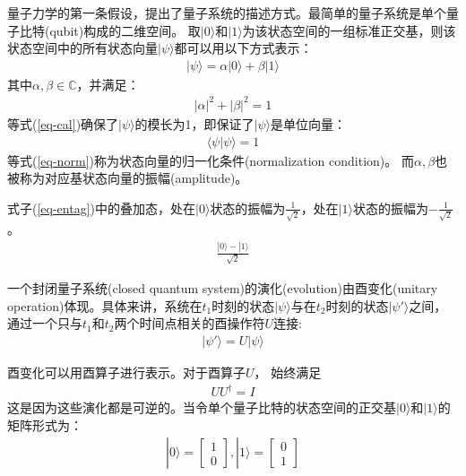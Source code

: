 量子力学的第一条假设，提出了量子系统的描述方式。最简单的量子系统是单个量子比特(qubit)构成的二维空间。
取$|0\rangle$和$|1\rangle$为该状态空间的一组标准正交基，则该状态空间中的所有状态向量$|\psi\rangle$都可以用以下方式表示：
\begin{align}
    |\psi\rangle = \alpha|0\rangle + \beta|1\rangle
\end{align}
其中$\alpha,\beta\in \mathbb{C}$，并满足：
\begin{align}
    |\alpha|^2+|\beta|^2  = 1
    \label{eq-cal}
\end{align}
等式(\ref{eq-cal})确保了$|\psi\rangle$的模长为1，即保证了$|\psi\rangle$是单位向量：
\begin{align}
    \langle\psi|\psi\rangle = 1
    \label{eq-norm}
\end{align}
等式(\ref{eq-norm})称为状态向量的归一化条件(normalization condition)。
而\(\alpha,\beta\)也被称为对应基状态向量的振幅(amplitude)。
\begin{example}
    式子(\ref{eq-entag})中的叠加态，处在$|0\rangle$状态的振幅为$\frac{1}{\sqrt{2}}$，处在$|1\rangle$状态的振幅为$-\frac{1}{\sqrt{2}}$。
\begin{align}
    \label{eq-entag}
    \frac{|0\rangle-|1\rangle}{\sqrt{2}}
\end{align}
\end{example}
\begin{theorem}\citep{nielsen2010quantum}
    一个封闭量子系统(closed quantum system)的演化(evolution)由酉变化(unitary operation)体现。具体来讲，系统在$t_1$时刻的状态$|\psi\rangle$与在$t_2$时刻的状态$|\psi'\rangle$之间，通过一个只与$t_1$和$t_2$两个时间点相关的酉操作符$U$连接:
    \begin{align}
        |\psi'\rangle = U|\psi\rangle
    \end{align}
\end{theorem}
酉变化可以用酉算子进行表示。对于酉算子$U$， 始终满足
\begin{align}
    U U^\dagger = I
\end{align}
这是因为这些演化都是可逆的。当令单个量子比特的状态空间的正交基$|0\rangle$和$|1\rangle$的矩阵形式为：
\begin{align}
    |0\rangle = \left[\begin{matrix}
        1\\0
    \end{matrix}\right],|1\rangle = \left[\begin{matrix}
        0\\1
    \end{matrix}\right]
\end{align}
